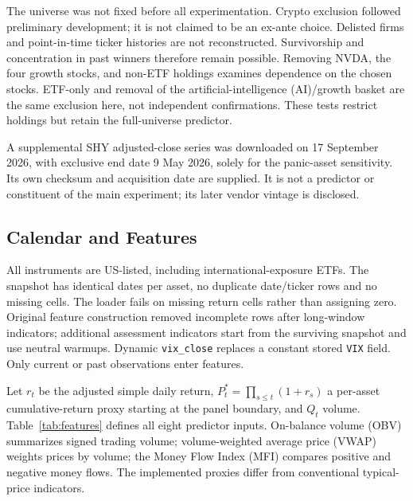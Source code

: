 \documentclass[3p,times]{elsarticle}
\begin{document}
The universe was not fixed before all experimentation. Crypto exclusion followed preliminary development; it is not claimed to be an ex-ante choice. Delisted firms and point-in-time ticker histories are not reconstructed. Survivorship and concentration in past winners therefore remain possible. Removing NVDA, the four growth stocks, and non-ETF holdings examines dependence on the chosen stocks. ETF-only and removal of the artificial-intelligence (AI)/growth basket are the same exclusion here, not independent confirmations. These tests restrict holdings but retain the full-universe predictor.

A supplemental SHY adjusted-close series was downloaded on 17 September 2026, with exclusive end date 9 May 2026, solely for the panic-asset sensitivity. Its own checksum and acquisition date are supplied. It is not a predictor or constituent of the main experiment; its later vendor vintage is disclosed.

\subsection{Calendar and Features}
All instruments are US-listed, including international-exposure ETFs. The snapshot has identical dates per asset, no duplicate date/ticker rows and no missing cells. The loader fails on missing return cells rather than assigning zero. Original feature construction removed incomplete rows after long-window indicators; additional assessment indicators start from the surviving snapshot and use neutral warmups. Dynamic \texttt{vix\_close} replaces a constant stored \texttt{VIX} field. Only current or past observations enter features.

Let $r_t$ be the adjusted simple daily return, $P_t^*=\prod_{s\le t}(1+r_s)$ a per-asset cumulative-return proxy starting at the panel boundary, and $Q_t$ volume. Table~\ref{tab:features} defines all eight predictor inputs. On-balance volume (OBV) summarizes signed trading volume; volume-weighted average price (VWAP) weights prices by volume; the Money Flow Index (MFI) compares positive and negative money flows. The implemented proxies differ from conventional typical-price indicators.
\end{document}
